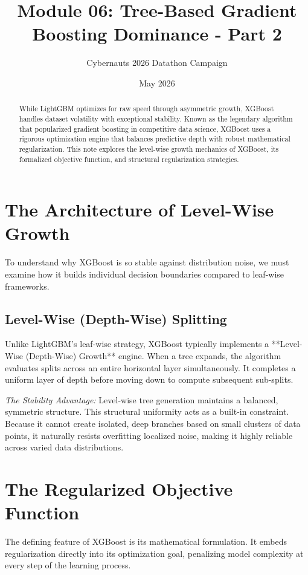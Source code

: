 \documentclass{article}
\title{Module 06: Tree-Based Gradient Boosting Dominance - Part 2}
\author{Cybernauts 2026 Datathon Campaign}
\date{May 2026}
\begin{document}
\maketitle

\begin{abstract}
While LightGBM optimizes for raw speed through asymmetric growth, XGBoost handles dataset volatility with exceptional stability. Known as the legendary algorithm that popularized gradient boosting in competitive data science, XGBoost uses a rigorous optimization engine that balances predictive depth with robust mathematical regularization. This note explores the level-wise growth mechanics of XGBoost, its formalized objective function, and structural regularization strategies.
\end{abstract}

\tableofcontents
\newpage

\section{The Architecture of Level-Wise Growth}
To understand why XGBoost is so stable against distribution noise, we must examine how it builds individual decision boundaries compared to leaf-wise frameworks.

\subsection{Level-Wise (Depth-Wise) Splitting}
Unlike LightGBM's leaf-wise strategy, XGBoost typically implements a **Level-Wise (Depth-Wise) Growth** engine. When a tree expands, the algorithm evaluates splits across an entire horizontal layer simultaneously. It completes a uniform layer of depth before moving down to compute subsequent sub-splits.

\textit{The Stability Advantage:} Level-wise tree generation maintains a balanced, symmetric structure. This structural uniformity acts as a built-in constraint. Because it cannot create isolated, deep branches based on small clusters of data points, it naturally resists overfitting localized noise, making it highly reliable across varied data distributions.

\section{The Regularized Objective Function}
The defining feature of XGBoost is its mathematical formulation. It embeds regularization directly into its optimization goal, penalizing model complexity at every step of the learning process.
\end{document}
